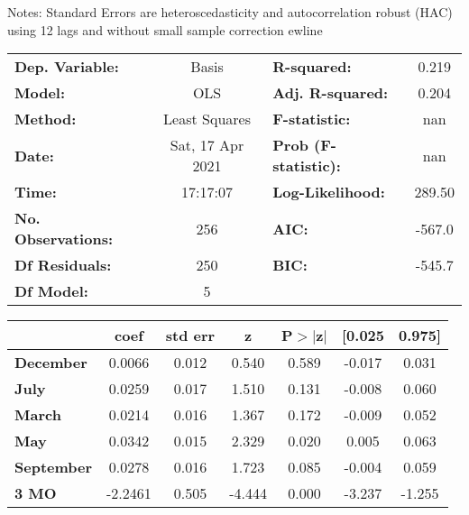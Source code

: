 Notes: \newline
 [1] Standard Errors are heteroscedasticity and autocorrelation robust (HAC) using 12 lags and without small sample correction
ewline\begin{center}
\begin{tabular}{lclc}
\toprule
\textbf{Dep. Variable:}    &      Basis       & \textbf{  R-squared:         } &     0.219   \\
\textbf{Model:}            &       OLS        & \textbf{  Adj. R-squared:    } &     0.204   \\
\textbf{Method:}           &  Least Squares   & \textbf{  F-statistic:       } &       nan   \\
\textbf{Date:}             & Sat, 17 Apr 2021 & \textbf{  Prob (F-statistic):} &      nan    \\
\textbf{Time:}             &     17:17:07     & \textbf{  Log-Likelihood:    } &    289.50   \\
\textbf{No. Observations:} &         256      & \textbf{  AIC:               } &    -567.0   \\
\textbf{Df Residuals:}     &         250      & \textbf{  BIC:               } &    -545.7   \\
\textbf{Df Model:}         &           5      & \textbf{                     } &             \\
\bottomrule
\end{tabular}
\begin{tabular}{lcccccc}
                   & \textbf{coef} & \textbf{std err} & \textbf{z} & \textbf{P$> |$z$|$} & \textbf{[0.025} & \textbf{0.975]}  \\
\midrule
\textbf{December}  &       0.0066  &        0.012     &     0.540  &         0.589        &       -0.017    &        0.031     \\
\textbf{July}      &       0.0259  &        0.017     &     1.510  &         0.131        &       -0.008    &        0.060     \\
\textbf{March}     &       0.0214  &        0.016     &     1.367  &         0.172        &       -0.009    &        0.052     \\
\textbf{May}       &       0.0342  &        0.015     &     2.329  &         0.020        &        0.005    &        0.063     \\
\textbf{September} &       0.0278  &        0.016     &     1.723  &         0.085        &       -0.004    &        0.059     \\
\textbf{3 MO}      &      -2.2461  &        0.505     &    -4.444  &         0.000        &       -3.237    &       -1.255     \\

\end{tabular}
\end{center}
